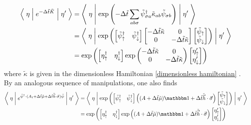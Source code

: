 \begin{align}
		\left\langle\;\eta\;\middle|\; e^{-\Delta \tilde{t} \tilde{K}} \;\middle|\;\eta'\;\right\rangle
	&= 
		\left\langle\;\eta\;\middle|\; \exp\left(-\Delta \tilde{t} \sum_{ab \sigma} \tilde{\psi}^{\dagger}_{\sigma a} \tilde{\kappa}_{ab} \tilde{\psi}_{\sigma b} \right)\;\middle|\;\eta'\;\right\rangle
	\nonumber\\
	&=
		\left\langle\;\eta\;\middle|\; \exp\left(
			\begin{bmatrix} \tilde{\psi}^{\dagger}_{\uparrow} &  \tilde{\psi}^{\dagger}_{\downarrow}  \end{bmatrix} 
			\begin{bmatrix}
				-\Delta \tilde{t} \tilde{\kappa}	& 0 \\
				0 									& -\Delta \tilde{t} \tilde{\kappa} 
			\end{bmatrix} 
			\begin{bmatrix} \tilde{\psi}_{\uparrow} \\  \tilde{\psi}_{\downarrow}  \end{bmatrix}
		\right) \;\middle|\;\eta'\;\right\rangle
	\nonumber\\
	& = 
		\exp\left( 
			\begin{bmatrix} {\eta}^{\dagger}_{\uparrow} &  {\eta}^{\dagger}_{\downarrow}  \end{bmatrix} 
			\exp\begin{pmatrix}
				-\Delta \tilde{t} \tilde{\kappa}	& 0 \\
				0 									& -\Delta \tilde{t} \tilde{\kappa} 
			\end{pmatrix} 
			\begin{bmatrix} {\eta}_{\uparrow}' \\  {\eta}_{\downarrow}'  \end{bmatrix}
		\right)
\end{align}
where $\tilde{\kappa}$ is given in the dimensionless Hamiltonian \eqref{dimensionless hamiltonian} .
By an analogous sequence of manipulations, one also finds
\begin{align}
	\matrixElement{\eta}{ e^{\tilde{\psi}\adjoint \cdot (A_t + \Delta\tilde{t} \tilde{\mu} + \Delta\tilde{t}\tilde{\vec{h}}\cdot\vec{\sigma})\tilde{\psi}} }{\eta'}
	&=
		\matrixElement{\eta}{ \exp\left(
			\begin{bmatrix} \tilde{\psi}^{\dagger}_{\up} &  \tilde{\psi}^{\dagger}_{\down}  \end{bmatrix} 
			\left(
				(A + \Delta\tilde{t}\tilde{\mu})\one + \Delta\tilde{t}\tilde{\vec{h}}\cdot\vec{\sigma}
			\right)
			\begin{bmatrix} \tilde{\psi}_{\up} \\  \tilde{\psi}_{\down}  \end{bmatrix}
		\right) }{\eta'}
	\label{eq:gaussian spinors}\\
	& = 
		\exp\left(
			\begin{bmatrix} \eta^{\dagger}_{\up} &  \eta^{\dagger}_{\down}  \end{bmatrix} 
			\exp\left(
				(A + \Delta\tilde{t}\tilde{\mu})\one + \Delta\tilde{t}\tilde{\vec{h}}\cdot\vec{\sigma}
			\right)
			\begin{bmatrix} \eta'_{\up} \\  \eta'_{\down}  \end{bmatrix}
		\right)
\end{align}
